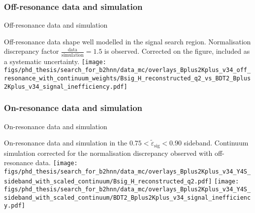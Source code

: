 \subsubsection{Off-resonance data and simulation}
\begin{frame}{Off-resonance data and simulation}
\bi
\item Off-resonance data shape well modelled in the signal search region.
\itemii Normalisation discrepancy factor $\frac{\mathrm{data}}{\mathrm{simulation}}=1.5$ is observed.
\bi
\itemii Corrected on the figure, included as a systematic uncertainty.
\ei
\ei
\vspace{0.5cm}
\centering
\texttt{[image: figs/phd\_thesis/search\_for\_b2hnn/data\_mc/overlays\_Bplus2Kplus\_v34\_off\_resonance\_with\_continuum\_weights/Bsig\_H\_reconstructed\_q2\_vs\_BDT2\_Bplus2Kplus\_v34\_signal\_inefficiency.pdf]}
\end{frame}
\subsubsection{On-resonance data and simulation}
\begin{frame}{On-resonance data and simulation}
\bi
\item On-resonance data and simulation in the $0.75<\tilde{\varepsilon}_{\mathrm{sig}}<0.90$ sideband.
\itemii Continuum simulation corrected for the normalisation discrepancy observed with off-resonance data.
\ei
\vspace{0.5cm}
\texttt{[image: figs/phd\_thesis/search\_for\_b2hnn/data\_mc/overlays\_Bplus2Kplus\_v34\_Y4S\_sideband\_with\_scaled\_continuum/Bsig\_H\_reconstructed\_q2.pdf]}
\texttt{[image: figs/phd\_thesis/search\_for\_b2hnn/data\_mc/overlays\_Bplus2Kplus\_v34\_Y4S\_sideband\_with\_scaled\_continuum/BDT2\_Bplus2Kplus\_v34\_signal\_inefficiency.pdf]}
\end{frame}
